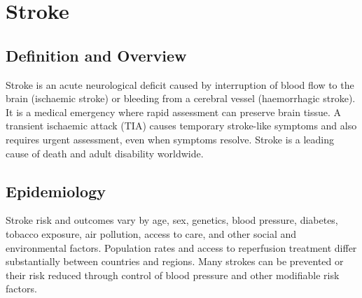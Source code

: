 \chapter{Stroke}

\section*{Definition and Overview}
Stroke is an acute neurological deficit caused by interruption of blood flow to the brain (ischaemic stroke) or bleeding from a cerebral vessel (haemorrhagic stroke). It is a medical emergency where rapid assessment can preserve brain tissue. A transient ischaemic attack (TIA) causes temporary stroke-like symptoms and also requires urgent assessment, even when symptoms resolve. Stroke is a leading cause of death and adult disability worldwide.

\section*{Epidemiology}
Stroke risk and outcomes vary by age, sex, genetics, blood pressure, diabetes, tobacco exposure, air pollution, access to care, and other social and environmental factors. Population rates and access to reperfusion treatment differ substantially between countries and regions. Many strokes can be prevented or their risk reduced through control of blood pressure and other modifiable risk factors.

